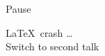 \documentclass[11pt]{beamer}
\begin{document}
\begin{frame}{Pause}

\vfill
\begin{center}
\LaTeX\ crash \ldots \\
Switch to second talk
\end{center}
\vfill

\end{frame}

\end{document}
